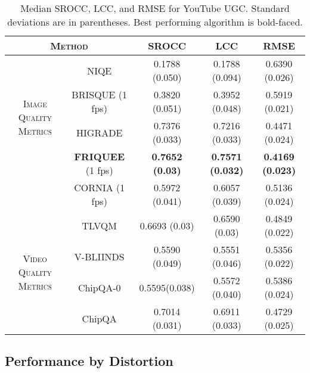 \documentclass[journal]{IEEEtran}
\begin{document}
\begin{table*}
\caption{Median SROCC, LCC, and RMSE for YouTube UGC. Standard deviations are in parentheses.  Best performing algorithm is bold-faced.}
\begin{center}
\begin{tabular}{|c|c|c|c|c|}
\hline
\multicolumn{2}{|c|}{\textsc{Method}}  &  SROCC & LCC & RMSE  \\  
\hline
\multirow{4}{*}{\textsc{Image Quality Metrics}} & NIQE\cite{niqe} & 0.1788 \scriptsize(0.050) & 0.1788 \scriptsize(0.094) & 0.6390 \scriptsize(0.026) \\
\cline{2-5}
& BRISQUE\cite{brisque} (1 fps) &  0.3820 \scriptsize(0.051) & 0.3952 \scriptsize(0.048) & 0.5919 \scriptsize(0.021)  \\
\cline{2-5}
& HIGRADE\cite{higrade} & 0.7376 \scriptsize(0.033) & 0.7216 \scriptsize(0.033) &  0.4471 \scriptsize(0.024)\\
\cline{2-5}
& \textbf{FRIQUEE}\cite{friquee} (1 fps) & \textbf{0.7652 \scriptsize(0.03)} & \textbf{0.7571 \scriptsize(0.032)}& \textbf{0.4169 \scriptsize(0.023)} \\
\cline{2-5}
& CORNIA\cite{cornia} (1 fps) & 0.5972{ \scriptsize(0.041)} & 0.6057{ \scriptsize(0.039)} & 0.5136{ \scriptsize(0.024)} \\
\hline
\multirow{4}{*}{\textsc{Video Quality Metrics}} & TLVQM\cite{tlvqm} &  0.6693 \scriptsize(0.03) & 0.6590 \scriptsize(0.03) & 0.4849 \scriptsize(0.022)\\
\cline{2-5}
& V-BLIINDS\cite{vbliinds} & 0.5590 \scriptsize(0.049) & 0.5551 \scriptsize(0.046) & 0.5356 \scriptsize(0.022) \\
\cline{2-5}
    & ChipQA-0\cite{chipqa0} & 0.5595\scriptsize(0.038)  & 0.5572 \scriptsize(0.040) & 0.5386 \scriptsize(0.024) \\
\cline{2-5}
& ChipQA & 0.7014 \scriptsize(0.031) & 0.6911 \scriptsize(0.033) & 0.4729 \scriptsize(0.025) \\
\hline
\end{tabular}
\label{tab:ytugc}
\end{center}
\end{table*}


\subsection{Performance by Distortion}
\end{document}
